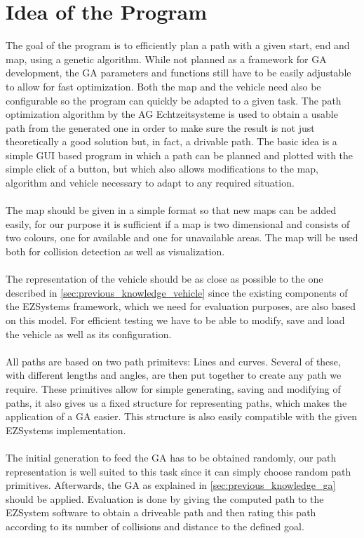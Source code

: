 \chapter{Idea of the Program}
\label{cha:program_idea}

The goal of the program is to efficiently plan a path with a given start, end and map, using a genetic algorithm. While not planned as a framework for GA development, the GA parameters and functions still have to be easily adjustable to allow for fast optimization. Both the map and the vehicle need also be configurable so the program can quickly be adapted to a given task. The path optimization algorithm by the AG Echtzeitsysteme is used to obtain a usable path from the generated one in order to make sure the result is not just theoretically a good solution but, in fact, a drivable path.
The basic idea is a simple GUI based program in which a path can be planned and plotted with the simple click of a button, but which also allows modifications to the map, algorithm and vehicle necessary to adapt to any required situation.\\
\\
The map should be given in a simple format so that new maps can be added easily, for our purpose it is sufficient if a map is two dimensional and consists of two colours, one for available and one for unavailable areas. The map will be used both for collision detection as well as visualization.\\
\\
The representation of the vehicle should be as close as possible to the one described in \ref{sec:previous_knowledge_vehicle} since the existing components of the EZSystems framework, which we need for evaluation purposes, are also based on this model. For efficient testing we have to be able to modify, save and load the vehicle as well as its configuration.\\
\\
All paths are based on two path primitevs: Lines and curves. Several of these, with different lengths and angles, are then put together to create any path we require. These primitives allow for simple generating, saving and modifying of paths, it also gives us a fixed structure for representing paths, which makes the application of a GA easier. This structure is also easily compatible with the given EZSystems implementation.\\
\\
The initial generation to feed the GA has to be obtained randomly, our path representation is well suited to this task since it can simply choose random path primitives. Afterwards, the GA as explained in \ref{sec:previous_knowledge_ga} should be applied. Evaluation is done by giving the computed path to the EZSystem software to obtain a driveable path and then rating this path according to its number of collisions and distance to the defined goal.